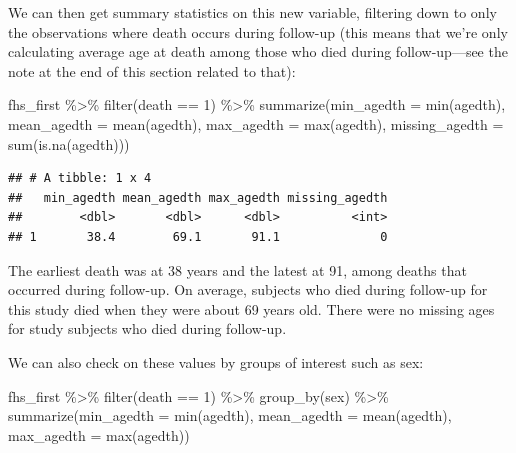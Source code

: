 \documentclass[
]{book}
\newenvironment{Shaded}{\begin{snugshade}}{\end{snugshade}}
\newcommand{\AttributeTok}[1]{\textcolor[rgb]{0.77,0.63,0.00}{#1}}
\newcommand{\DecValTok}[1]{\textcolor[rgb]{0.00,0.00,0.81}{#1}}
\newcommand{\FunctionTok}[1]{\textcolor[rgb]{0.00,0.00,0.00}{#1}}
\newcommand{\NormalTok}[1]{#1}
\newcommand{\SpecialCharTok}[1]{\textcolor[rgb]{0.00,0.00,0.00}{#1}}
\begin{document}
We can then get summary statistics on this new variable, filtering down to only the observations where death occurs during follow-up (this means that we're only calculating average age at death among those who died during follow-up---see the note at the end of this section related to that):

\begin{Shaded}
\begin{Highlighting}[]
\NormalTok{fhs\_first }\SpecialCharTok{\%\textgreater{}\%} 
  \FunctionTok{filter}\NormalTok{(death }\SpecialCharTok{==} \DecValTok{1}\NormalTok{) }\SpecialCharTok{\%\textgreater{}\%} 
  \FunctionTok{summarize}\NormalTok{(}\AttributeTok{min\_agedth =} \FunctionTok{min}\NormalTok{(agedth),}
            \AttributeTok{mean\_agedth =} \FunctionTok{mean}\NormalTok{(agedth),}
            \AttributeTok{max\_agedth =} \FunctionTok{max}\NormalTok{(agedth),}
            \AttributeTok{missing\_agedth =} \FunctionTok{sum}\NormalTok{(}\FunctionTok{is.na}\NormalTok{(agedth)))}
\end{Highlighting}
\end{Shaded}

\begin{verbatim}
## # A tibble: 1 x 4
##   min_agedth mean_agedth max_agedth missing_agedth
##        <dbl>       <dbl>      <dbl>          <int>
## 1       38.4        69.1       91.1              0
\end{verbatim}

The earliest death was at 38 years and the latest at 91, among deaths that occurred during follow-up. On average, subjects who died during follow-up for this study died when they were about 69 years old. There were no missing ages for study subjects who died during follow-up.

We can also check on these values by groups of interest such as sex:

\begin{Shaded}
\begin{Highlighting}[]
\NormalTok{fhs\_first }\SpecialCharTok{\%\textgreater{}\%}
  \FunctionTok{filter}\NormalTok{(death }\SpecialCharTok{==} \DecValTok{1}\NormalTok{) }\SpecialCharTok{\%\textgreater{}\%} 
  \FunctionTok{group\_by}\NormalTok{(sex) }\SpecialCharTok{\%\textgreater{}\%}
  \FunctionTok{summarize}\NormalTok{(}\AttributeTok{min\_agedth =} \FunctionTok{min}\NormalTok{(agedth),}
            \AttributeTok{mean\_agedth =} \FunctionTok{mean}\NormalTok{(agedth),}
            \AttributeTok{max\_agedth =} \FunctionTok{max}\NormalTok{(agedth))}
\end{Highlighting}
\end{Shaded}
\end{document}
